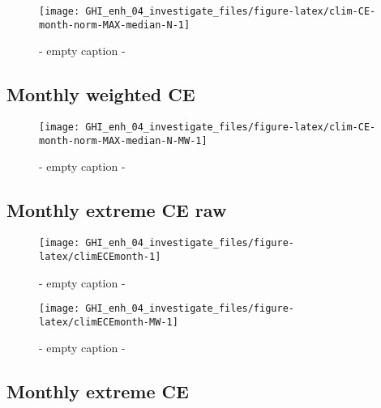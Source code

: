 \documentclass[
  10pt,
  a4paper,oneside]{article}
\begin{document}
\begin{figure}[H]

{\centering \texttt{[image: GHI\_enh\_04\_investigate\_files/figure-latex/clim-CE-month-norm-MAX-median-N-1]} 

}

\caption{ - empty caption - }\label{fig:clim-CE-month-norm-MAX-median-N}
\end{figure}

\hypertarget{monthly-weighted-ce}{%
\subsection{Monthly weighted CE}\label{monthly-weighted-ce}}

\begin{figure}[H]

{\centering \texttt{[image: GHI\_enh\_04\_investigate\_files/figure-latex/clim-CE-month-norm-MAX-median-N-MW-1]} 

}

\caption{ - empty caption - }\label{fig:clim-CE-month-norm-MAX-median-N-MW}
\end{figure}

\hypertarget{monthly-extreme-ce-raw}{%
\subsection{Monthly extreme CE raw}\label{monthly-extreme-ce-raw}}

\begin{figure}[H]

{\centering \texttt{[image: GHI\_enh\_04\_investigate\_files/figure-latex/climECEmonth-1]} 

}

\caption{ - empty caption - }\label{fig:climECEmonth}
\end{figure}
\begin{figure}[H]

{\centering \texttt{[image: GHI\_enh\_04\_investigate\_files/figure-latex/climECEmonth-MW-1]} 

}

\caption{ - empty caption - }\label{fig:climECEmonth-MW}
\end{figure}

\hypertarget{monthly-extreme-ce}{%
\subsection{Monthly extreme CE}\label{monthly-extreme-ce}}
\end{document}
